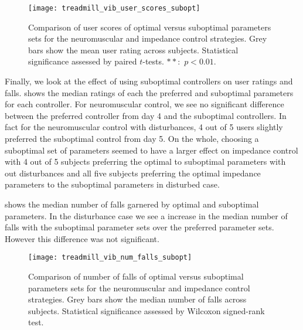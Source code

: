 \begin{figure}[t]
    \centering 
    \texttt{[image: treadmill\_vib\_user\_scores\_subopt]}
    \caption[Comparison of user scores of optimal versus suboptimal parameters
    sets]{Comparison of user scores of optimal versus suboptimal parameters sets
    for the neuromuscular and impedance control strategies. Grey bars show the
    mean user rating across subjects. Statistical significance assessed by
    paired $t$-tests. $**$:~$p <
    0.01$.}\label{fig:treadmill_exp_user_ratings_subopt}
\end{figure}
Finally, we look at the effect of using suboptimal controllers on user ratings
and falls.  shows the median ratings of
each the preferred and suboptimal parameters for each controller. For
neuromuscular control, we see no significant difference between the preferred
controller from day 4 and the suboptimal controllers. In fact for the
neuromuscular control with disturbances, 4 out of 5 users slightly preferred the
suboptimal control from day 5. On the whole, choosing a suboptimal set of
parameters seemed to have a larger effect on impedance control with 4 out of 5
subjects preferring the optimal to suboptimal parameters with out disturbances
and all five subjects preferring the optimal impedance parameters to the
suboptimal parameters in disturbed case.

 shows the median number of falls
garnered by optimal and suboptimal parameters. In the disturbance case we see a
increase in the median number of falls with the suboptimal parameter sets over
the preferred parameter sets. However this difference was not significant.

\begin{figure}[b]
    \centering 
    \texttt{[image: treadmill\_vib\_num\_falls\_subopt]}
    \caption[Comparison of number of falls of optimal versus suboptimal
    parameters sets]{Comparison of number of falls of optimal versus suboptimal
    parameters sets for the neuromuscular and impedance control strategies. Grey
    bars show the median number of falls across subjects. Statistical
    significance assessed by Wilcoxon signed-rank
    test.}\label{fig:treadmill_exp_num_falls_subopt}
\end{figure}
